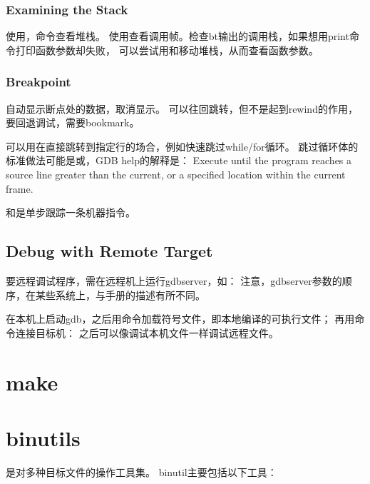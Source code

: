 \subsection{Examining the Stack}
使用，命令查看堆栈。
使用查看调用帧。检查bt输出的调用栈，如果想用print命令打印函数参数却失败，
可以尝试用和移动堆栈，从而查看函数参数。

\subsection{Breakpoint}
自动显示断点处的数据，取消显示。
可以往回跳转，但不是起到rewind的作用，要回退调试，需要bookmark。

可以用在直接跳转到指定行的场合，例如快速跳过while/for循环。
跳过循环体的标准做法可能是或，GDB help的解释是：
Execute until the program reaches a source line greater than the current,
or a specified location within the current frame.

和是单步跟踪一条机器指令。

\section{Debug with Remote Target}
要远程调试程序，需在远程机上运行gdbserver，如：
注意，gdbserver参数的顺序，在某些系统上，与手册的描述有所不同。

在本机上启动gdb，之后用命令加载符号文件，即本地编译的可执行文件；
再用命令连接目标机：
之后可以像调试本机文件一样调试远程文件。

\chapter{make}

\chapter{binutils}
是对多种目标文件的操作工具集。
binutil主要包括以下工具：

